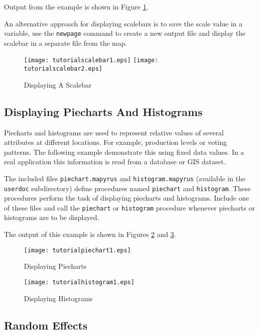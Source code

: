 Output from the example is shown in Figure \ref{tutorialscalebar1}.

An alternative approach for displaying scalebars is to save the scale value in
a variable, use the \texttt{newpage} command to create a new output file and
display the scalebar in a separate file from the map.



\begin{figure}[htb]
\texttt{[image: tutorialscalebar1.eps]}
\texttt{[image: tutorialscalebar2.eps]}
\caption{Displaying A Scalebar}
\label{tutorialscalebar1}
\end{figure}

\subsection{Displaying Piecharts And Histograms}
\label{piechart}

Piecharts and histograms
are used to represent relative values of several attributes at
different locations.  For example, production levels or voting patterns.  The
following example demonstrate this using fixed data values.
In a real application this information is read from a
database or GIS dataset.

The included files
\texttt{piechart.mapyrus}
and
\texttt{histogram.mapyrus}
(available in the \texttt{userdoc}
subdirectory) define procedures named
\texttt{piechart}
and
\texttt{histogram}.
These procedures
perform the task of displaying piecharts and histograms.
Include one of these files and call the
\texttt{piechart}
or
\texttt{histogram}
procedure whenever piecharts or histograms are to be displayed.

The output of this example is shown in Figures
\ref{tutorialpiechart1}
and
\ref{tutorialhistogram1}.



\begin{figure}[htb]
\texttt{[image: tutorialpiechart1.eps]}
\caption{Displaying Piecharts}
\label{tutorialpiechart1}
\end{figure}

\begin{figure}[htb]
\texttt{[image: tutorialhistogram1.eps]}
\caption{Displaying Histograms}
\label{tutorialhistogram1}
\end{figure}

\subsection{Random Effects}

